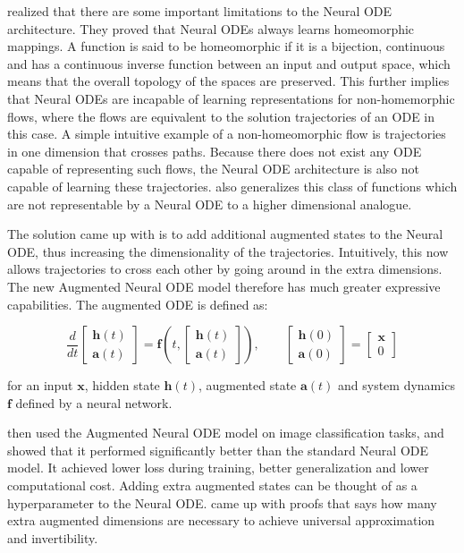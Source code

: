 \documentclass[12pt,a4paper]{book}
\begin{document}
\cite{dupont2019augmented} realized that there are some important limitations to the Neural ODE architecture. They proved that Neural ODEs always learns homeomorphic mappings. A function is said to be homeomorphic if it is a bijection, continuous and has a continuous inverse function between an input and output space, which means that the overall topology of the spaces are preserved. This further implies that Neural ODEs are incapable of learning representations for non-homemorphic flows, where the flows are equivalent to the solution trajectories of an ODE in this case. A simple intuitive example of a non-homeomorphic flow is trajectories in one dimension that crosses paths. Because there does not exist any ODE capable of representing such flows, the Neural ODE architecture is also not capable of learning these trajectories. \cite{dupont2019augmented} also generalizes this class of functions which are not representable by a Neural ODE to a higher dimensional analogue.

The solution \cite{dupont2019augmented} came up with is to add additional augmented states to the Neural ODE, thus increasing the dimensionality of the trajectories. Intuitively, this now allows trajectories to cross each other by going around in the extra dimensions. The new Augmented Neural ODE model therefore has much greater expressive capabilities. The augmented ODE is defined as:

\begin{equation}
    \frac{d}{d t} \begin{bmatrix} \bm{h}(t) \\ \bm{a}(t) \end{bmatrix} = \bm{f}(t, \begin{bmatrix} \bm{h}(t) \\ \bm{a}(t) \end{bmatrix}),
    \qquad \begin{bmatrix} \bm{h}(0) \\ \bm{a}(0) \end{bmatrix} = \begin{bmatrix} \bm{x} \\ 0 \end{bmatrix}
\end{equation}

\noindent for an input $\bm{x}$, hidden state $\bm{h}(t)$, augmented state $\bm{a}(t)$ and system dynamics $\bm{f}$ defined by a neural network.

\cite{dupont2019augmented} then used the Augmented Neural ODE model on image classification tasks, and showed that it performed significantly better than the standard Neural ODE model. It achieved lower loss during training, better generalization and lower computational cost. Adding extra augmented states can be thought of as a hyperparameter to the Neural ODE. \cite{approxnode} came up with proofs that says how many extra augmented dimensions are necessary to achieve universal approximation and invertibility.
\end{document}
